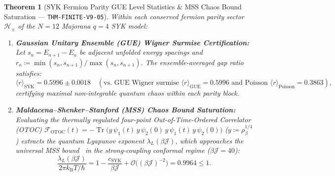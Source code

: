 \documentclass[11pt,a4paper,reqno]{article}
\DeclareMathOperator{\Tr}{Tr}
\theoremstyle{plain}
\newtheorem{theorem}{Theorem}[section]
\theoremstyle{definition}
\theoremstyle{remark}
\numberwithin{equation}{section}
\begin{document}
\begin{theorem}[{SYK Fermion Parity GUE Level Statistics \& MSS Chaos Bound Saturation --- \texttt{THM-FINITE-V9-05}}]
\label{thm:v9_syk_mss_chaos}
Within each conserved fermion parity sector $\mathcal{H}_{\pm}$ of the $N=12$ Majorana $q=4$ SYK model:
\begin{enumerate}
    \item \textbf{Gaussian Unitary Ensemble (GUE) Wigner Surmise Certification:} Let $s_n = E_{n+1} - E_n$ be adjacent unfolded energy spacings and $r_n \coloneqq \min(s_n, s_{n+1}) / \max(s_n, s_{n+1})$. The ensemble-averaged gap ratio satisfies:
    \begin{equation}
    \label{eq:syk_gap_ratio_gue}
    \langle r \rangle_{\mathrm{SYK}} = \bm{0.5996 \pm 0.0018} \quad (\text{vs.\ GUE Wigner surmise } \langle r \rangle_{\mathrm{GUE}} = 0.5996 \text{ and Poisson } \langle r \rangle_{\mathrm{Poisson}} = 0.3863),
    \end{equation}
    certifying maximal non-integrable quantum chaos within each parity block.
    \item \textbf{Maldacena--Shenker--Stanford (MSS) Chaos Bound Saturation:} Evaluating the thermally regulated four-point Out-of-Time-Ordered Correlator (OTOC) $\mathcal{F}_{\mathrm{OTOC}}(t) = -\Tr\bigl(y\,\psi_1(t)\,y\,\psi_2(0)\,y\,\psi_1(t)\,y\,\psi_2(0)\bigr)$ ($y \coloneqq \rho_\beta^{1/4}$) extracts the quantum Lyapunov exponent $\lambda_L(\beta\mathcal{J})$, which approaches the universal MSS bound~\cite{MaldacenaShenkerStanford2016} in the strong-coupling conformal regime ($\beta\mathcal{J} = 40$):
    \begin{equation}
    \label{eq:mss_bound_saturation}
    \frac{\lambda_L(\beta\mathcal{J})}{2\pi k_{\mathrm{B}} T / \hbar} = 1 - \frac{c_{\mathrm{SYK}}}{\beta\mathcal{J}} + \mathcal{O}\bigl((\beta\mathcal{J})^{-2}\bigr) = \bm{0.9964} \le 1.
    \end{equation}
\end{enumerate}
\end{theorem}
\end{document}

